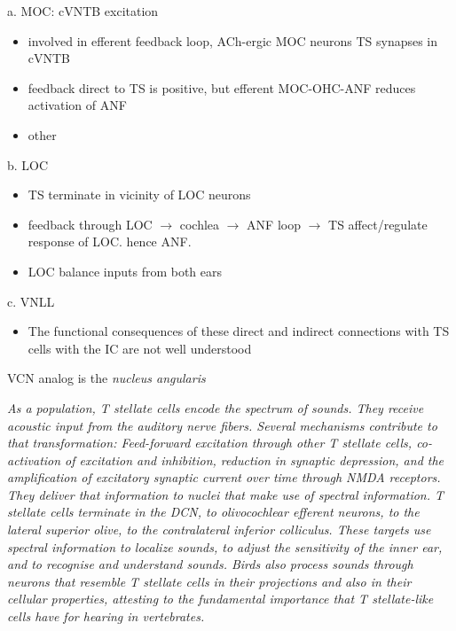 a. MOC: cVNTB excitation 

\begin{itemize}
\item involved in efferent feedback loop, ACh-ergic MOC neurons TS synapses in cVNTB \citep{WarrBeck:1996,Warr:1992,Warr:1982,VeneciaLibermanEtAl:2005,ThompsonThompson:1991,SmithJorisEtAl:1993}
\item feedback direct to TS is positive, but efferent MOC-OHC-ANF reduces activation of ANF \citep{WarrenLiberman:1989,WiederholdKiang:1970}
\item other \citep{RobertsonMulders:2000,WinterRobertsonEtAl:1989}
\end{itemize}

b. LOC

\begin{itemize}
\item TS terminate in vicinity of LOC neurons \citep{Warr:1982,ThompsonThompson:1988,ThompsonThompson:1991,DoucetRyugo:2003}
\item feedback through LOC $\rightarrow$ cochlea $\rightarrow$ ANF loop $\rightarrow$ TS affect/regulate response of LOC. hence ANF.
\item LOC balance inputs from both ears \citep{DarrowMaisonEtAl:2006}
\end{itemize}

c. VNLL

\begin{itemize}
\item The functional consequences of these direct and indirect connections with TS cells with the IC are not well understood
\end{itemize}
\label{sec-1_7}


VCN analog is the \emph{nucleus angularis}
\label{sec-1_8}


{\it As a population, T stellate cells encode the spectrum of sounds. They
receive acoustic input from the auditory nerve fibers. Several
mechanisms contribute to that transformation: Feed-forward excitation
through other T stellate cells, co-activation of excitation and
inhibition, reduction in synaptic depression, and the amplification of
excitatory synaptic current over time through NMDA receptors. They
deliver that information to nuclei that make use of spectral
information.  T stellate cells terminate in the DCN, to olivocochlear
efferent neurons, to the lateral superior olive, to the contralateral
inferior colliculus. These targets use spectral information to
localize sounds, to adjust the sensitivity of the inner ear, and to
recognise and understand sounds. Birds also process sounds through
neurons that resemble T stellate cells in their projections and also
in their cellular properties, attesting to the fundamental importance
that T stellate-like cells have for hearing in vertebrates.}






